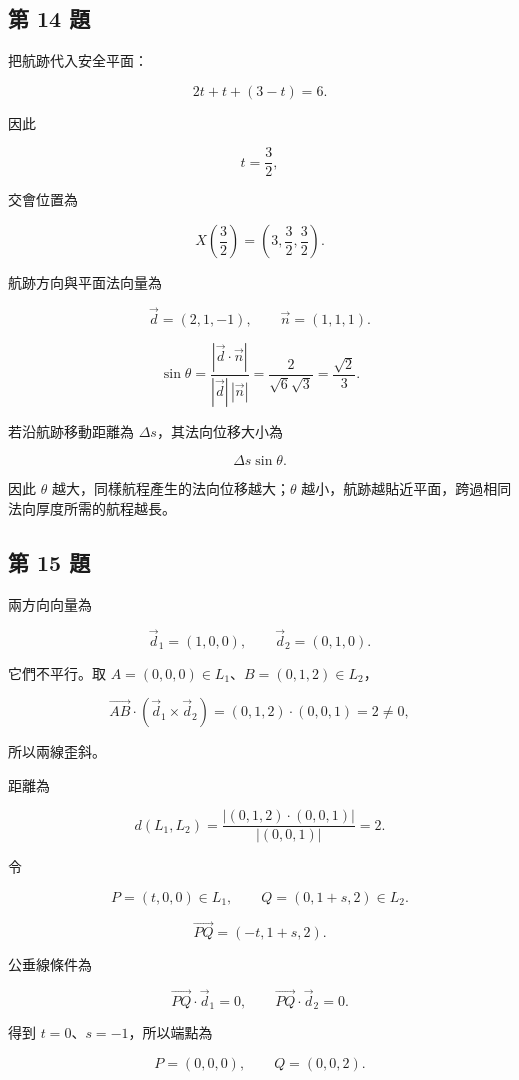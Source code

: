 \documentclass[11pt,a4paper]{article}
\begin{document}
\subsection{第 14 題}\label{ux7b2c-14-ux984c}

把航跡代入安全平面：

\[
2t+t+(3-t)=6.
\]

因此

\[
t=\frac32,
\]

交會位置為

\[
\boxed{X\left(\frac32\right)
=\left(3,\frac32,\frac32\right)}.
\]

航跡方向與平面法向量為

\[
\vec d=(2,1,-1),\qquad \vec n=(1,1,1).
\]

\[
\sin\theta
=\frac{|\vec d\cdot\vec n|}{|\vec d|\,|\vec n|}
=\frac2{\sqrt6\sqrt3}
=\boxed{\frac{\sqrt2}{3}}.
\]

若沿航跡移動距離為 \(\Delta s\)，其法向位移大小為

\[
\Delta s\sin\theta.
\]

因此 \(\theta\) 越大，同樣航程產生的法向位移越大；\(\theta\) 越小，航跡越貼近平面，跨過相同法向厚度所需的航程越長。

\subsection{第 15 題}\label{ux7b2c-15-ux984c}

兩方向向量為

\[
\vec d_1=(1,0,0),\qquad \vec d_2=(0,1,0).
\]

它們不平行。取 \(A=(0,0,0)\in L_1\)、\(B=(0,1,2)\in L_2\)，

\[
\overrightarrow{AB}\cdot(\vec d_1\times\vec d_2)
=(0,1,2)\cdot(0,0,1)=2\ne0,
\]

所以兩線歪斜。

距離為

\[
d(L_1,L_2)
=\frac{|(0,1,2)\cdot(0,0,1)|}{|(0,0,1)|}
=\boxed2.
\]

令

\[
P=(t,0,0)\in L_1,
\qquad Q=(0,1+s,2)\in L_2.
\]

\[
\overrightarrow{PQ}=(-t,1+s,2).
\]

公垂線條件為

\[
\overrightarrow{PQ}\cdot\vec d_1=0,
\qquad
\overrightarrow{PQ}\cdot\vec d_2=0.
\]

得到 \(t=0\)、\(s=-1\)，所以端點為

\[
\boxed{P=(0,0,0),\qquad Q=(0,0,2)}.
\]
\end{document}
